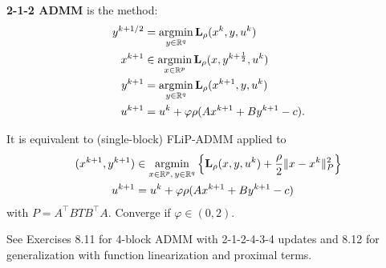 \documentclass[10pt,mathserif]{beamer}
\begin{document}
\begin{frame}
\textbf{2-1-2 ADMM} is the method:
\begin{align*}
y^{k+1/2} &= \operatorname*{argmin}_{y\in \mathbb{R}^q}\mathbf{L}_\rho (x^k,y,u^k) \\
x^{k+1} &\in \operatorname*{argmin}_{x\in \mathbb{R}^p} \mathbf{L}_\rho (x,y^{k+\frac{1}{2}},u^k)\\
y^{k+1} &= \operatorname*{argmin}_{y\in \mathbb{R}^q}\mathbf{L}_\rho (x^{k+1},y,u^k)  \\
u^{k+1} &= u^k + \varphi\rho(Ax^{k+1}+By^{k+1}-c).
\end{align*}

It is equivalent to (single-block) FLiP-ADMM applied to 
\[  \begin{alignedat}{2}
     (x^{k+1},y^{k+1}) & \in\operatorname*{argmin}_{x\in\mathbb{R}^p,\,y\in\mathbb{R}^q}\left\{ \mathbf{L}_\rho (x,y,u^k)+ \frac{\rho}{2}\|x-x^{k}\|_{P}^2 \right\}\\
     u^{k+1} & = u^k + \varphi\rho(Ax^{k+1}+By^{k+1}-c)
  \end{alignedat}
\]
with $P=A^\intercal  BTB^\intercal  A$. Converge if $\varphi\in(0,2)$.
\medskip

See Exercises 8.11 for 4-block ADMM with 2-1-2-4-3-4 updates and 8.12 for generalization with function linearization and proximal terms.
\end{frame}
\end{document}
